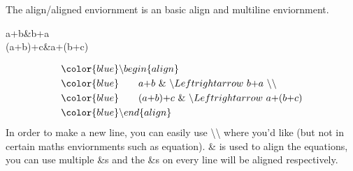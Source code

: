 \documentclass{beamer}
\begin{document}
\begin{frame}
	The {\color{blue}align/aligned} enviornment is an basic align and multiline enviornment.\\
	\begin{example}
		\begin{flalign}
			a+b&\Leftrightarrow b+a\\
			(a+b)+c&\Leftrightarrow a+(b+c)
		\end{flalign}
	\end{example}
	\begin{align*}
		&\color{blue} \backslash begin\{align\}\\
		&\color{blue} \quad\quad a\text{+}b\ \&\ \backslash Leftrightarrow\ b\text{+}a\ \backslash\backslash \\
		&\color{blue} \quad\quad (a\text{+}b)\text{+}c\ \&\ \backslash Leftrightarrow\ a\text{+}(b\text{+}c)\\
		&\color{blue} \backslash end\{align\}
	\end{align*}
	In order to make a new line, you can easily use {\color{blue}\textbackslash\textbackslash} where you'd like (but not in certain maths enviornments such as {\color{blue}equation}). {\color{blue}\&} is used to align the equations, you can use multiple {\color{blue}\&}s and the {\color{blue}\&}s on every line will be aligned respectively.
\end{frame}
\end{document}
